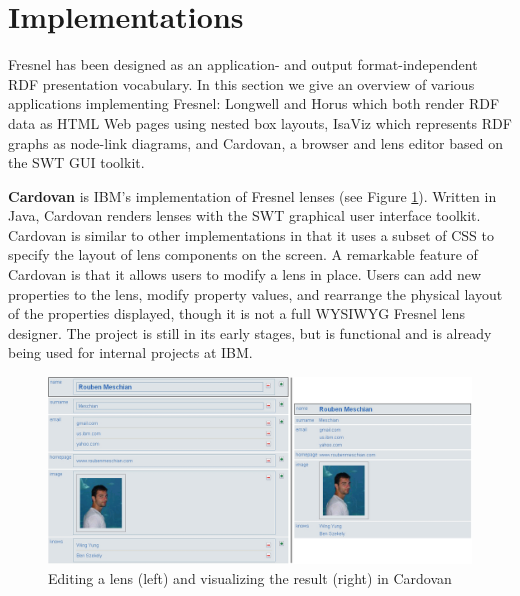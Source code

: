 \section{Implementations}
\label{impl}

Fresnel has been designed as an application- and output format-independent RDF presentation vocabulary. In this section we give an overview of various applications implementing Fresnel: Longwell \cite{simile} and Horus \cite{horus} which both render RDF data as HTML Web pages using nested box layouts, IsaViz \cite{isaviz} which represents RDF graphs as node-link diagrams, and Cardovan, a browser and lens editor based on the SWT GUI toolkit.







\vspace{1em}
{\bf Cardovan} is IBM's implementation of Fresnel lenses (see Figure \ref{cardovanFig}). Written in Java, Cardovan renders lenses with the SWT graphical user interface toolkit.  Cardovan is similar to other implementations in that it uses a subset of CSS to specify the layout of lens components on the screen. A remarkable feature of Cardovan is that it allows users to modify a lens in place. Users can add new properties to the lens, modify property values, and rearrange the physical layout of the properties displayed, though it is not a full WYSIWYG Fresnel lens designer. The project is still in its early stages, but is functional and is already being used for internal projects at IBM.

\begin{figure}
\begin{center}
\includegraphics[width=12.2cm]{cardovan.png}
\end{center}
\vspace{-2em}
\caption{Editing a lens (left) and visualizing the result (right) in Cardovan}
\label{cardovanFig}
\end{figure}
